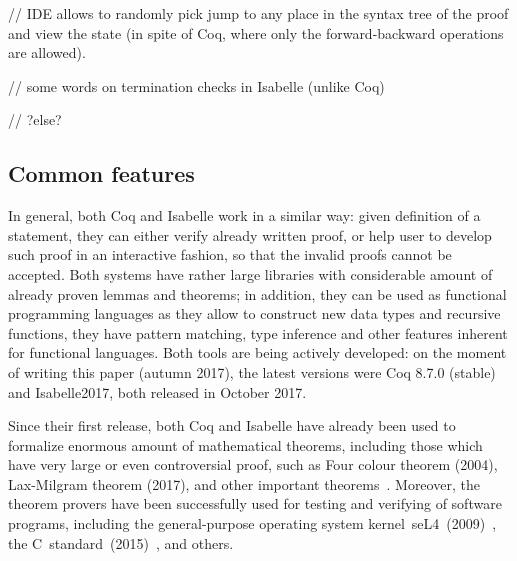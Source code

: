 \documentclass[article]{aaltoseries}
\begin{document}
// IDE allows to randomly pick jump to any place in the syntax tree of the proof and view the state (in spite of Coq, where only the forward-backward operations are allowed).


// some words on termination checks in Isabelle (unlike Coq)

// ?else?



\subsection{Common features}

In general, both Coq and Isabelle work in a similar way: given definition of a statement, they can either verify already written proof, or help user to develop such proof in an interactive fashion, so that the invalid proofs cannot be accepted. Both systems have rather large libraries with considerable amount of already proven lemmas and theorems; in addition, they can be used as functional programming languages as they allow to construct new data types and recursive functions, they have pattern matching, type inference and other features inherent for functional languages. Both tools are being actively developed: on the moment of writing this paper (autumn 2017), the latest versions were Coq 8.7.0 (stable) and Isabelle2017, both released in October 2017.

Since their first release, both Coq and Isabelle have already been used to formalize enormous amount of mathematical theorems, including those which have very large or even controversial proof, such as Four colour theorem (2004), Lax-Milgram theorem (2017), and other important theorems~\cite{Wiedijk100}. Moreover, the theorem provers have been successfully used for testing and verifying of software programs, including the general-purpose operating system kernel~seL4~(2009)~\cite{Klein09}, the C~standard~(2015)~\cite{Krebbers15}, and others.
\end{document}
